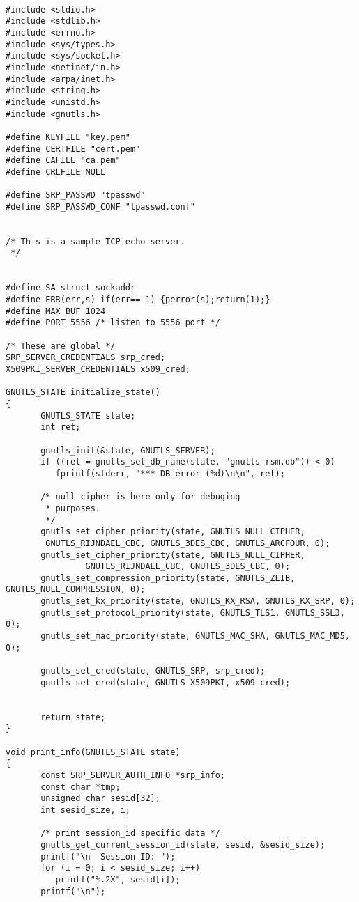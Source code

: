 \begin{verbatim}

#include <stdio.h>
#include <stdlib.h>
#include <errno.h>
#include <sys/types.h>
#include <sys/socket.h>
#include <netinet/in.h>
#include <arpa/inet.h>
#include <string.h>
#include <unistd.h>
#include <gnutls.h>

#define KEYFILE "key.pem"
#define CERTFILE "cert.pem"
#define CAFILE "ca.pem"
#define CRLFILE NULL

#define SRP_PASSWD "tpasswd"
#define SRP_PASSWD_CONF "tpasswd.conf"


/* This is a sample TCP echo server.
 */


#define SA struct sockaddr
#define ERR(err,s) if(err==-1) {perror(s);return(1);}
#define MAX_BUF 1024
#define PORT 5556 /* listen to 5556 port */

/* These are global */
SRP_SERVER_CREDENTIALS srp_cred;
X509PKI_SERVER_CREDENTIALS x509_cred;

GNUTLS_STATE initialize_state()
{
       GNUTLS_STATE state;
       int ret;

       gnutls_init(&state, GNUTLS_SERVER);
       if ((ret = gnutls_set_db_name(state, "gnutls-rsm.db")) < 0)
	      fprintf(stderr, "*** DB error (%d)\n\n", ret);

       /* null cipher is here only for debuging 
        * purposes.
        */
       gnutls_set_cipher_priority(state, GNUTLS_NULL_CIPHER,
		GNUTLS_RIJNDAEL_CBC, GNUTLS_3DES_CBC, GNUTLS_ARCFOUR, 0);
       gnutls_set_cipher_priority(state, GNUTLS_NULL_CIPHER,
				GNUTLS_RIJNDAEL_CBC, GNUTLS_3DES_CBC, 0);
       gnutls_set_compression_priority(state, GNUTLS_ZLIB, GNUTLS_NULL_COMPRESSION, 0);
       gnutls_set_kx_priority(state, GNUTLS_KX_RSA, GNUTLS_KX_SRP, 0);
       gnutls_set_protocol_priority(state, GNUTLS_TLS1, GNUTLS_SSL3, 0);
       gnutls_set_mac_priority(state, GNUTLS_MAC_SHA, GNUTLS_MAC_MD5, 0);

       gnutls_set_cred(state, GNUTLS_SRP, srp_cred);
       gnutls_set_cred(state, GNUTLS_X509PKI, x509_cred);


       return state;
}

void print_info(GNUTLS_STATE state)
{
       const SRP_SERVER_AUTH_INFO *srp_info;
       const char *tmp;
       unsigned char sesid[32];
       int sesid_size, i;

       /* print session_id specific data */
       gnutls_get_current_session_id(state, sesid, &sesid_size);
       printf("\n- Session ID: ");
       for (i = 0; i < sesid_size; i++)
	      printf("%.2X", sesid[i]);
       printf("\n");


\end{verbatim}
